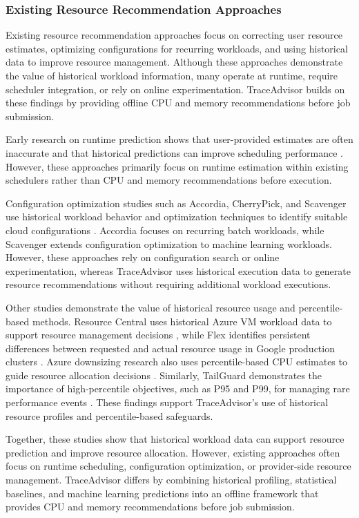 \documentclass{IEEEtran}
\begin{document}
\subsubsection{Existing Resource Recommendation Approaches}

Existing resource recommendation approaches focus on correcting user resource estimates, optimizing configurations for recurring workloads, and using historical data to improve resource management. Although these approaches demonstrate the value of historical workload information, many operate at runtime, require scheduler integration, or rely on online experimentation. TraceAdvisor builds on these findings by providing offline CPU and memory recommendations before job submission.

Early research on runtime prediction shows that user-provided estimates are often inaccurate and that historical predictions can improve scheduling performance \cite{ref04,ref14}. However, these approaches primarily focus on runtime estimation within existing schedulers rather than CPU and memory recommendations before execution.

Configuration optimization studies such as Accordia, CherryPick, and Scavenger use historical workload behavior and optimization techniques to identify suitable cloud configurations \cite{ref03,ref15,ref16}. Accordia focuses on recurring batch workloads, while Scavenger extends configuration optimization to machine learning workloads. However, these approaches rely on configuration search or online experimentation, whereas TraceAdvisor uses historical execution data to generate resource recommendations without requiring additional workload executions.

Other studies demonstrate the value of historical resource usage and percentile-based methods. Resource Central uses historical Azure VM workload data to support resource management decisions \cite{ref02}, while Flex identifies persistent differences between requested and actual resource usage in Google production clusters \cite{ref01}. Azure downsizing research also uses percentile-based CPU estimates to guide resource allocation decisions \cite{ref17}. Similarly, TailGuard demonstrates the importance of high-percentile objectives, such as P95 and P99, for managing rare performance events \cite{ref18}. These findings support TraceAdvisor's use of historical resource profiles and percentile-based safeguards.

Together, these studies show that historical workload data can support resource prediction and improve resource allocation. However, existing approaches often focus on runtime scheduling, configuration optimization, or provider-side resource management. TraceAdvisor differs by combining historical profiling, statistical baselines, and machine learning predictions into an offline framework that provides CPU and memory recommendations before job submission.
\end{document}
